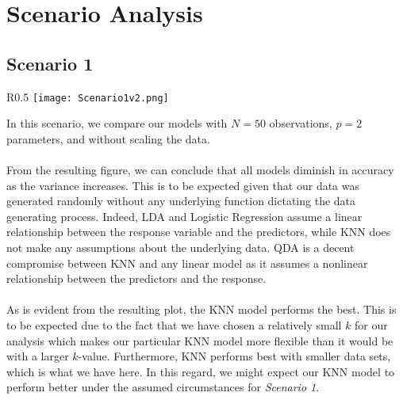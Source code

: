 \documentclass[11pt, oneside]{article}
\begin{document}
\pagebreak
\section{Scenario Analysis}
\subsection{Scenario 1}

\begin{wrapfigure}[]{R}{0.5\textwidth}
\vspace{-0.55cm}
\texttt{[image: Scenario1v2.png]}
\vspace{-.55cm}
\end{wrapfigure}
In this scenario, we compare our models with $N=50$ observations, $p=2$ parameters, and without scaling the data.\\
\\
From the resulting figure, we can conclude that all models diminish in accuracy as the variance increases. This is to be expected given that our data was generated randomly without any underlying function dictating the data generating process. Indeed, LDA and Logistic Regression assume a linear relationship between the response variable and the predictors, while KNN does not make any assumptions about the underlying data. QDA is a decent compromise between KNN and any linear model as it assumes a nonlinear relationship between the predictors and the response.\\
\\
As is evident from the resulting plot, the KNN model performs the best. This is to be expected due to the fact that we have chosen a relatively small $k$ for our analysis which makes our particular KNN model more flexible than it would be with a larger $k$-value. Furthermore, KNN performs best with smaller data sets, which is what we have here. In this regard, we might expect our KNN model to perform better under the assumed circumstances for \emph{Scenario 1}.\\
\\
\end{document}
